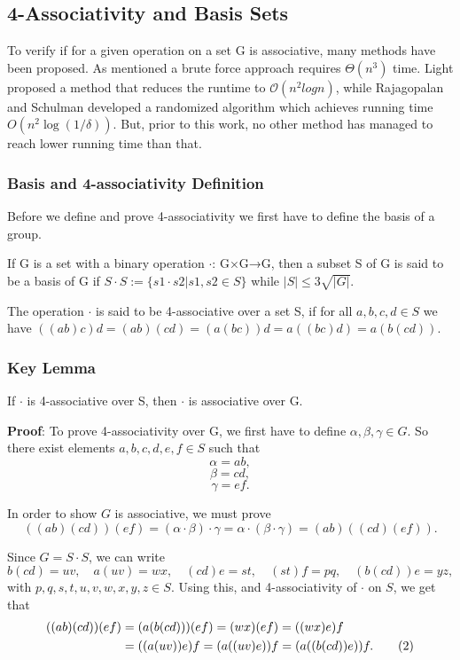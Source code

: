 \documentclass[sigconf]{acmart}
\begin{document}
\subsection{4-Associativity and Basis Sets}
To verify if for a given operation on a set G is associative, many methods have been proposed. As mentioned a brute force approach requires \(\Theta(n^3)\) time. Light proposed a method that reduces the runtime to \(\mathcal{O}(n^2logn)\), while Rajagopalan and Schulman developed a randomized algorithm which achieves running time $O(n^2 \log(1/\delta))$. But, prior to this work, no other method has managed to reach lower running time than that.

\subsubsection{Basis and 4-associativity Definition}
Before we define and prove 4-associativity we first have to define the basis of a group.

If G is a set with a binary operation \(\cdot\): G×G→G, then a subset S of G is said to be a basis of G if $S\cdot S := \{s1\cdot s2 |s1,s2 \in S\}$ while $|S|\le3\sqrt{|G|}$.

The operation \(\cdot\) is said to be 4-associative over a set S, if for all $a,b,c,d \in S$ we have $((ab)c)d= (ab)(cd) = (a(bc))d= a((bc)d) = a(b(cd))$.

\subsubsection{Key Lemma}
If \(\cdot\) is 4-associative over S, then \(\cdot\) is associative over G.

\textbf{Proof}:
To prove 4-associativity over G, we first have to define \(\alpha, \beta,\gamma \in G\). So there exist elements \(a,b,c,d,e,f \in S\) such that
\[\alpha = ab,\]
\[\beta = cd,\]
\[\gamma = ef.\]


In order to show \( G \) is associative, we must prove
\begin{equation}
((ab)(cd))(ef) = (\alpha \cdot \beta) \cdot \gamma = \alpha \cdot (\beta \cdot \gamma) = (ab)((cd)(ef)). \tag{1}
\end{equation}

Since \( G = S \cdot S \), we can write
\[
b(cd) = uv, \quad a(uv) = wx, \quad (cd)e = st, \quad (st)f = pq, \quad (b(cd))e = yz,
\]
with \( p, q, s, t, u, v, w, x, y, z \in S \). Using this, and 4-associativity of \( \cdot \) on \( S \), we get that
\begin{align}
((ab)(cd))(ef) &= (a(b(cd)))(ef) = (wx)(ef) = ((wx)e)f \notag \\
&= ((a(uv))e)f = (a((uv)e))f = (a((b(cd))e))f. \tag{2}
\end{align}
\end{document}
